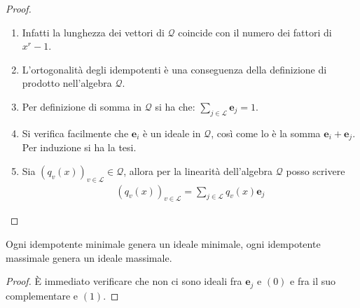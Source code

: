 \begin{proof}
   \begin{enumerate}
      \item Infatti la lunghezza dei vettori di $\mathcal{Q}$ coincide con il numero dei fattori di $x^r-1$. 
      \item L'ortogonalità degli idempotenti è una conseguenza della definizione di prodotto nell'algebra $\mathcal{Q}$.
      \item Per definizione di somma in $\mathcal{Q}$ si ha che: $\sum_{j \in \mathscr{L}}\mathbf{e}_{j}  = \mathfrak{1}$.
      \item Si verifica facilmente che $\mathbf{e}_{i} $ è un ideale in $\mathcal{Q}$, così come lo è la somma $\mathbf{e}_{i} + \mathbf{e}_{j}$. Per induzione si ha la tesi.
      \item Sia $(q_{v}(x))_{v \in \mathscr{L}} \in \mathcal{Q}$, allora per la linearità dell'algebra $\mathcal{Q}$ posso scrivere
      \begin{align*}
         (q_{v}(x))_{v \in \mathscr{L}} = \sum_{j \in \mathscr{L}} q_{v}(x) \mathbf{e}_{j} 
      \end{align*}
   \end{enumerate}
\end{proof}

\begin{corollario}\label{coroll:idempotentiMinimali}
   Ogni idempotente minimale genera un ideale minimale, ogni idempotente massimale genera un ideale massimale.
\end{corollario}
\begin{proof}
   È immediato verificare che non ci sono ideali fra $\mathbf{e}_{j}$ e $(0)$ e fra il suo complementare e $(1)$.
\end{proof}
